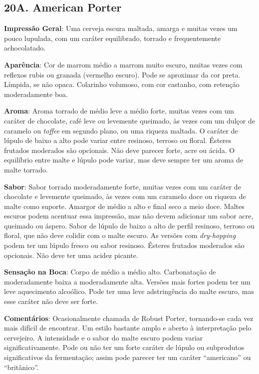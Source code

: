 \subsection*{20A. American Porter}

\textbf{Impressão Geral}: Uma cerveja escura maltada, amarga e muitas vezes um pouco lupulada, com um caráter equilibrado, torrado e frequentemente achocolatado.

\textbf{Aparência}: Cor de marrom médio a marrom muito escuro, muitas vezes com reflexos rubis ou granada (vermelho escuro). Pode se aproximar da cor preta. Límpida, se não opaca. Colarinho volumoso, com cor castanho, com retenção moderadamente boa.

\textbf{Aroma}: Aroma torrado de médio leve a médio forte, muitas vezes com um caráter de chocolate, café leve ou levemente queimado, às vezes com um dulçor de caramelo ou \textit{toffee} em segundo plano, ou uma riqueza maltada. O caráter de lúpulo de baixo a alto pode variar entre resinoso, terroso ou floral. Ésteres frutados moderados são opcionais. Não deve parecer forte, acre ou ácida. O equilíbrio entre malte e lúpulo pode variar, mas deve sempre ter um aroma de malte torrado.

\textbf{Sabor}: Sabor torrado moderadamente forte, muitas vezes com um caráter de chocolate e levemente queimado, às vezes com um caramelo doce ou riqueza de malte como suporte. Amargor de médio a alto e final seco a meio doce. Maltes escuros podem acentuar essa impressão, mas não devem adicionar um sabor acre, queimado ou áspero. Sabor de lúpulo de baixo a alto de perfil resinoso, terroso ou floral, que não deve colidir com o malte escuro. As versões com \textit{dry-hopping} podem ter um lúpulo fresco ou sabor resinoso. Ésteres frutados moderados são opcionais. Não deve ter uma acidez picante.

\textbf{Sensação na Boca}: Corpo de médio a médio alto. Carbonatação de moderadamente baixa a moderadamente alta. Versões mais fortes podem ter um leve aquecimento alcoólico. Pode ter uma leve adstringência do malte escuro, mas esse caráter não deve ser forte.

\textbf{Comentários}: Ocasionalmente chamada de Robust Porter, tornando-se cada vez mais difícil de encontrar. Um estilo bastante amplo e aberto à interpretação pelo cervejeiro. A intensidade e o sabor do malte escuro podem variar significativamente. Pode ou não ter um forte caráter de lúpulo ou subprodutos significativos da fermentação; assim pode parecer ter um caráter “americano” ou “britânico”.

